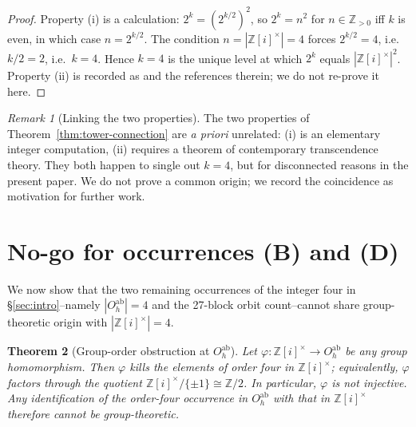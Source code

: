 \documentclass[11pt,reqno]{amsart}
\theoremstyle{plain}
\newtheorem{theorem}{Theorem}[section]
\theoremstyle{definition}
\theoremstyle{remark}
\newtheorem{remark}[theorem]{Remark}
\numberwithin{equation}{section}
\begin{document}
\begin{proof}
Property (i) is a calculation: $2^{k} = (2^{k/2})^{2}$, so $2^{k} =
n^{2}$ for $n \in \mathbb{Z}_{>0}$ iff $k$ is even, in which case
$n = 2^{k/2}$. The condition $n = |\mathbb{Z}[i]^{\times}| = 4$
forces $2^{k/2} = 4$, i.e.\ $k/2 = 2$, i.e.\ $k = 4$. Hence $k = 4$
is the unique level at which $2^{k}$ equals
$|\mathbb{Z}[i]^{\times}|^{2}$. Property (ii) is recorded as
\cite[Theorem 3.2]{paper-a} and the references therein; we do not
re-prove it here.
\end{proof}

\begin{remark}[Linking the two properties]
The two properties of Theorem~\ref{thm:tower-connection} are
\emph{a priori} unrelated: (i) is an elementary integer
computation, (ii) requires a theorem of contemporary transcendence
theory. They both happen to single out $k = 4$, but for
disconnected reasons in the present paper. We do not prove a
common origin; we record the coincidence as motivation for further
work.
\end{remark}

\section{No-go for occurrences (B) and (D)}
\label{sec:no-go}

We now show that the two remaining occurrences of the integer four
in \S\ref{sec:intro}--namely $|O_{h}^{\mathrm{ab}}| = 4$ and the
27-block orbit count--cannot share group-theoretic origin with
$|\mathbb{Z}[i]^{\times}| = 4$.

\begin{theorem}[Group-order obstruction at $O_{h}^{\mathrm{ab}}$]
\label{thm:no-go}
Let $\varphi \colon \mathbb{Z}[i]^{\times} \to O_{h}^{\mathrm{ab}}$
be any group homomorphism. Then $\varphi$ kills the elements of
order four in $\mathbb{Z}[i]^{\times}$; equivalently, $\varphi$
factors through the quotient $\mathbb{Z}[i]^{\times}/\{\pm 1\}
\cong \mathbb{Z}/2$. In particular, $\varphi$ is not injective. Any
identification of the order-four occurrence in
$O_{h}^{\mathrm{ab}}$ with that in $\mathbb{Z}[i]^{\times}$
therefore cannot be group-theoretic.
\end{theorem}
\end{document}
